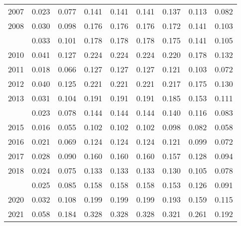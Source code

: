 \documentclass[
]{article}
\begin{document}
\begin{longtable}[t]{lrrrrrrrr}
2007 & 0.023 & 0.077 & 0.141 & 0.141 & 0.141 & 0.137 & 0.113 & 0.082\\
2008 & 0.030 & 0.098 & 0.176 & 0.176 & 0.176 & 0.172 & 0.141 & 0.103\\
\addlinespace
2009 & 0.033 & 0.101 & 0.178 & 0.178 & 0.178 & 0.175 & 0.141 & 0.105\\
2010 & 0.041 & 0.127 & 0.224 & 0.224 & 0.224 & 0.220 & 0.178 & 0.132\\
2011 & 0.018 & 0.066 & 0.127 & 0.127 & 0.127 & 0.121 & 0.103 & 0.072\\
2012 & 0.040 & 0.125 & 0.221 & 0.221 & 0.221 & 0.217 & 0.175 & 0.130\\
2013 & 0.031 & 0.104 & 0.191 & 0.191 & 0.191 & 0.185 & 0.153 & 0.111\\
\addlinespace
2014 & 0.023 & 0.078 & 0.144 & 0.144 & 0.144 & 0.140 & 0.116 & 0.083\\
2015 & 0.016 & 0.055 & 0.102 & 0.102 & 0.102 & 0.098 & 0.082 & 0.058\\
2016 & 0.021 & 0.069 & 0.124 & 0.124 & 0.124 & 0.121 & 0.099 & 0.072\\
2017 & 0.028 & 0.090 & 0.160 & 0.160 & 0.160 & 0.157 & 0.128 & 0.094\\
2018 & 0.024 & 0.075 & 0.133 & 0.133 & 0.133 & 0.130 & 0.105 & 0.078\\
\addlinespace
2019 & 0.025 & 0.085 & 0.158 & 0.158 & 0.158 & 0.153 & 0.126 & 0.091\\
2020 & 0.032 & 0.108 & 0.199 & 0.199 & 0.199 & 0.193 & 0.159 & 0.115\\
2021 & 0.058 & 0.184 & 0.328 & 0.328 & 0.328 & 0.321 & 0.261 & 0.192\\*
\end{longtable}
\end{document}
